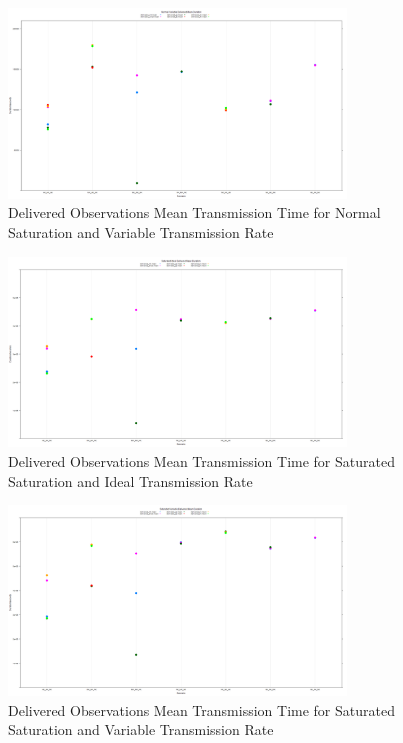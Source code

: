 	\begin{figure}[H]
	\centering
	\includegraphics[width=0.8\textwidth]{Chap7/figures/plots/normal_variable/delivered_mean.png}
	\caption{Delivered Observations Mean Transmission Time for Normal Saturation and Variable Transmission Rate}
	\label{fig:sim:res:norm:variable:delmean}
	\end{figure}

	\begin{figure}[H]
	\centering
	\includegraphics[width=0.8\textwidth]{Chap7/figures/plots/saturated_ideal/delivered_mean.png}
	\caption{Delivered Observations Mean Transmission Time for Saturated Saturation and Ideal Transmission Rate}
	\label{fig:sim:res:sat:ideal:delmean}
	\end{figure}

	\begin{figure}[H]
	\centering
	\includegraphics[width=0.8\textwidth]{Chap7/figures/plots/saturated_variable/delivered_mean.png}
	\caption{Delivered Observations Mean Transmission Time for Saturated Saturation and Variable Transmission Rate}
	\label{fig:sim:res:sat:variable:delmean}
	\end{figure}

